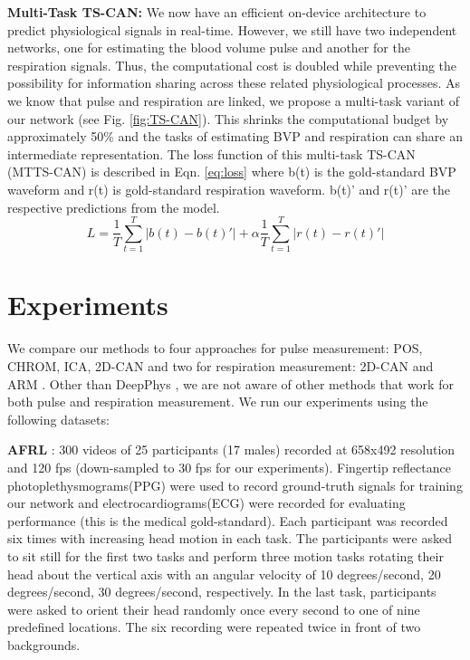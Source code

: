 \documentclass{article}
\begin{document}
\textbf{Multi-Task TS-CAN:}
We now have an efficient on-device architecture to predict physiological signals in real-time. However, we still have two independent networks, one for estimating the blood volume pulse and another for the respiration signals. Thus, the computational cost is doubled while preventing the possibility for information sharing across these related physiological processes.
As we know that pulse and respiration are linked, we propose a multi-task variant of our network (see Fig. \ref{fig:TS-CAN}). This shrinks the computational budget by approximately 50\% and the tasks of estimating BVP and respiration can share an intermediate representation. The loss function of this multi-task TS-CAN (MTTS-CAN) is described in Eqn. \ref{eq:loss} where b(t) is the gold-standard BVP waveform and r(t) is gold-standard respiration waveform. b(t)' and r(t)' are the respective predictions from the model. 
\begin{equation} \label{eq:loss}
    L = \frac{1}{T}\sum_{t=1}^{T} |b(t) - b(t)'| + \alpha\frac{1}{T}\sum_{t=1}^{T} |r(t) - r(t)'|
\end{equation}

\section{Experiments}
\vspace{-1mm}
We compare our methods to four approaches for pulse measurement: POS\citep{wang2016algorithmic}, CHROM\citep{de2013robust}, ICA\citep{poh2010advancements}, 2D-CAN\citep{chen2018deepphys} and two for respiration measurement: 2D-CAN and ARM \citep{tarassenko2014non}. Other than DeepPhys \cite{chen2018deepphys}, we are not aware of other methods that work for both pulse and respiration measurement. We run our experiments using the following datasets: 

\textbf{AFRL} \citep{estepp2014recovering}: 300 videos of 25 participants (17 males) recorded at 658x492 resolution and 120 fps (down-sampled to 30 fps for our experiments). Fingertip reflectance photoplethysmograms(PPG) were used to record ground-truth signals for training our network and electrocardiograms(ECG) were recorded for evaluating performance (this is the medical gold-standard). Each participant was recorded six times with increasing head motion in each task. The participants were asked to sit still for the first two tasks and perform three motion tasks rotating their head about the vertical axis with an angular velocity of 10 degrees/second, 20 degrees/second, 30 degrees/second, respectively. In the last task, participants were asked to orient their head randomly once every second to one of nine predefined locations. The six recording were repeated twice in front of two backgrounds.
\end{document}
